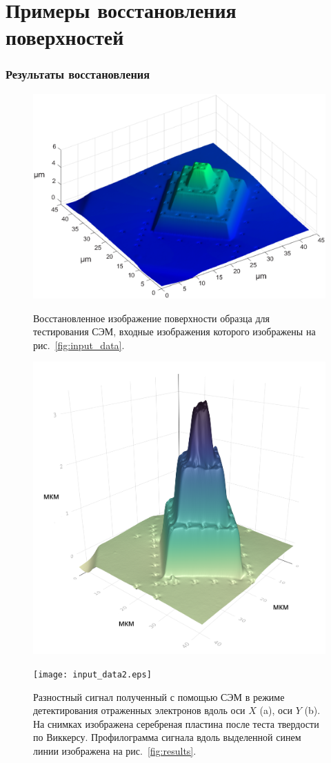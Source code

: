 \documentclass{beamer}
\begin{document}
\section{Примеры восстановления поверхностей}
\begin{frame}
    \sectionpage
\end{frame}

\begin{frame}[c,allowframebreaks]
    \frametitle{Результаты восстановления}

    \begin{figure}[ht]
        \includegraphics[width=0.65\linewidth]{berger.eps}
        \caption{Восстановленное изображение поверхности образца для тестирования СЭМ, входные
        изображения которого изображены на рис.~\ref{fig:input_data}.}
        {\label{fig:berger}}%
    \end{figure}

\framebreak

    \begin{figure}[ht]
        \includegraphics[width=0.55\linewidth]{pyramid_rotated.png}
    \end{figure}

\framebreak

    \begin{figure}[ht]
        \texttt{[image: input\_data2.eps]}
        \caption{Разностный сигнал полученный с помощью СЭМ в режиме детектирования отраженных
            электронов вдоль оси $X$ (a), оси $Y$ (b). На снимках изображена серебреная пластина
            после теста твердости по Виккерсу. Профилограмма сигнала вдоль выделенной синем линии
            изображена на рис.~\ref{fig:results}.}
        {\label{fig:input_data2}}%
    \end{figure}


\end{frame}
\end{document}
